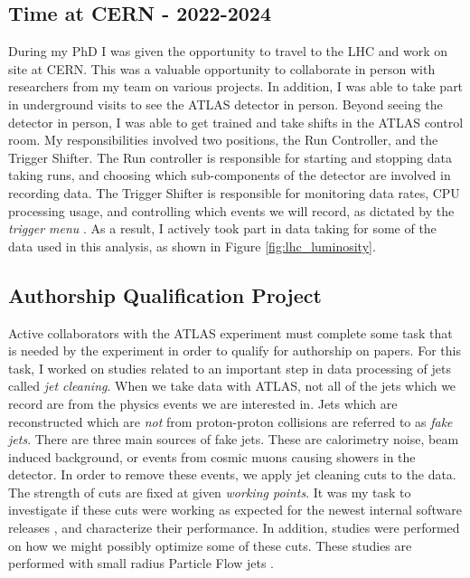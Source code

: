 \documentclass[12pt]{article}
\begin{document}
\subsection{Time at CERN - 2022-2024}
During my PhD I was given the opportunity to travel to the LHC and work on site
at CERN. This was a valuable opportunity to collaborate in person with
researchers from my team on various projects. In addition, I was able to take
part in underground visits to see the ATLAS detector in person. Beyond seeing
the detector in person, I was able to get trained and take shifts in the ATLAS
control room. My responsibilities involved two positions, the Run Controller,
and the Trigger Shifter. The Run controller is responsible for starting and
stopping data taking runs, and choosing which sub-components of the detector are
involved in recording data. The Trigger Shifter is responsible for monitoring
data rates, CPU processing usage, and controlling which events we will record,
as dictated by the \textit{trigger menu} \cite{trigger_2017, HLT_2016}. As a
result, I actively took part in data taking for some of the data used in this
analysis, as shown in Figure \ref{fig:lhc_luminosity}.



\subsection{Authorship Qualification Project}
Active collaborators with the ATLAS experiment must complete some task that is
needed by the experiment in order to qualify for authorship on papers. For this
task, I worked on studies related to an important step in data processing of
jets called
\textit{jet cleaning}. When we take data with ATLAS, not all of the jets which
we record are from the physics events we are interested in. Jets which are
reconstructed which are \textit{not} from proton-proton collisions are referred
to as \textit{fake jets}. There are three main sources of fake jets. These are
calorimetry noise, beam induced background, or events from cosmic muons causing
showers in the detector. In order to remove these events, we apply jet cleaning
cuts to the data. The strength of cuts are fixed at given \textit{working
points}. It was my task to investigate if these cuts were working as expected
for the newest internal software releases \cite{atlas_simulation}, and
characterize their performance. In addition, studies were performed on how we
might possibly optimize some of these cuts. These studies are performed with
small radius Particle Flow jets \cite{pflow_jets}.
\end{document}

